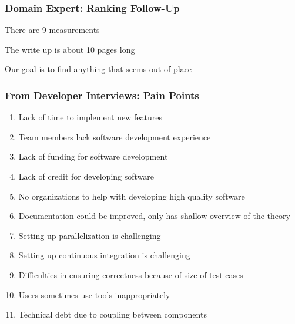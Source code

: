 \documentclass[t,12pt,numbers,fleqn]{beamer}
\begin{document}

\begin{frame}
\frametitle{Domain Expert: Ranking Follow-Up}

\bi
\item {}
\bi
\item There are 9 measurements
\item The write up is about 10 pages long
\item Our goal is to find anything that seems out of place
  \ei \ei

\end{frame}


\begin{frame}
\frametitle{From Developer Interviews: Pain Points}

\begin{enumerate}
\item Lack of time to implement new features \label{LackOfTime}
\item Team members lack software development experience
\item Lack of funding for software development
\item Lack of credit for developing software \label{LackOfCredit}
\item No organizations to help with developing high quality software \label{NoOrg}
\item Documentation could be improved, only has shallow overview of the theory
\item Setting up parallelization is challenging
\item Setting up continuous integration is challenging
\item Difficulties in ensuring correctness because of size of test cases
\item Users sometimes use tools inappropriately
\item Technical debt due to coupling between components
\end{enumerate}

\end{frame}

\end{document}
